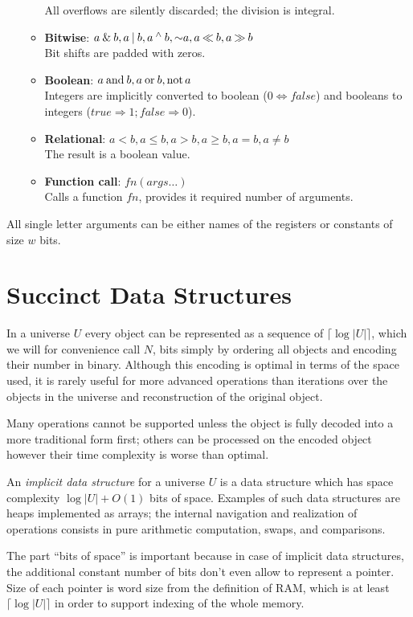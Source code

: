 \begin{enumerate}
\begin{itemize}
		All overflows are silently discarded; the division is integral.
		\item \textbf{Bitwise}: $a \mathbin{\&} b, a \mathbin{|} b, a \mathbin{^\wedge} b, \mathord{\sim} a, a \mathbin{\ll} b, a \mathbin{\gg} b$ \\
		Bit shifts are padded with zeros.
		\item \textbf{Boolean}: $a \mathbin{\textrm{and}} b, a \mathbin{\textrm{or}} b, \mathord{\textrm{not}\,} a$ \\
		Integers are implicitly converted to boolean ($0 \Leftrightarrow false$) and booleans to integers ($true \Rightarrow 1; false \Rightarrow 0$).
		\item \textbf{Relational}: $a < b, a \le b, a > b, a \ge b, a = b, a \ne b$ \\
		The result is a boolean value.
		\item \textbf{Function call}: $fn(args\ldots)$ \\
		Calls a function $fn$, provides it required number of arguments.
	\end{itemize}
\end{enumerate}
All single letter arguments can be either names of the registers or constants of size $w$ bits.

\section{Succinct Data Structures}

In a universe $U$ every object can be represented as a sequence of $\lceil \log |U| \rceil$, which we will for convenience call $N$, bits simply by ordering all objects and encoding their number in binary.
Although this encoding is optimal in terms of the space used, it is rarely useful for more advanced operations than iterations over the objects in the universe and reconstruction of the original object.

Many operations cannot be supported unless the object is fully decoded into a more traditional form first; others can be processed on the encoded object however their time complexity is worse than optimal.

An \emph{implicit data structure} for a universe $U$ is a data structure which has space complexity $ \log |U| + O(1) $ bits of space.
Examples of such data structures are heaps implemented as arrays; the internal navigation and realization of operations consists in pure arithmetic computation, swaps, and comparisons.

The part ``bits of space'' is important because in case of implicit data structures, the additional constant number of bits don't even allow to represent a pointer.
Size of each pointer is word size from the definition of RAM, which is at least $\lceil \log |U| \rceil$ in order to support indexing of the whole memory.

